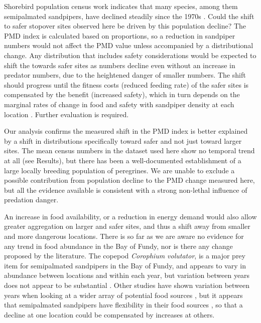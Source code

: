 Shorebird population census work indicates that many species, among them semipalmated sandpipers, have declined steadily since the 1970s \citep{bart_survey_2007,Andres2012b,Gratto-Trevor2012,Smith2012a,morrison_dramatic_2012}. Could the shift to safer stopover sites observed here be driven by this population decline? The PMD index is calculated based on proportions, so a reduction in sandpiper numbers would not affect the PMD value unless accompanied by a distributional change. Any distribution that includes safety considerations \citep{grand1999predation,Moody1996} would be expected to shift the towards safer sites as numbers decline even without an increase in predator numbers, due to the heightened danger of smaller numbers. The shift should progress until the fitness costs (reduced feeding rate) of the safer sites is compensated by the benefit (increased safety), which in turn depends on the marginal rates of change in food and safety with sandpiper density at each location \citep{Ydenberg2017}. Further evaluation is required.

Our analysis confirms the measured shift in the PMD index is better explained by a shift in distributions specifically toward safer and not just toward larger sites. The mean census numbers in the dataset used here show no temporal trend at all (see Results), but there has been a well-documented establishment of a large locally breeding population of peregrines. We are unable to exclude a possible contribution from population decline to the PMD change measured here, but all the evidence available is consistent with a strong non-lethal influence of predation danger.

An increase in food availability, or a reduction in energy demand would also allow greater aggregation on larger and safer sites, and thus a shift away from smaller and more dangerous locations. There is so far as we are aware no evidence for any trend in food abundance in the Bay of Fundy, nor is there any change proposed by the literature. The copepod \textit{Corophium volutator}, is a major prey item for semipalmated sandpipers in the Bay of Fundy, and appears to vary in abundance between locations and within each year, but variation between years does not appear to be substantial \citep{Barbeau2009a}. Other studies have shown variation between years when looking at a wider array of potential food sources \citep{Quinn2012a}, but it appears that semipalmated sandpipers have flexibility in their food sources \citep{Quinn2017}, so that a decline at one location could be compensated by  increases at others.

